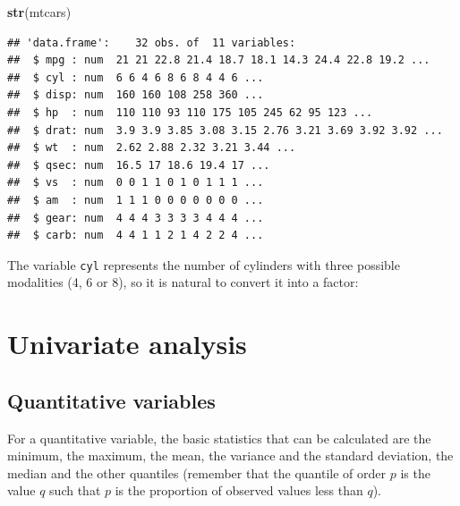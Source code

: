 \documentclass[]{book}
\newenvironment{Shaded}{\begin{snugshade}}{\end{snugshade}}
\newcommand{\KeywordTok}[1]{\textcolor[rgb]{0.13,0.29,0.53}{\textbf{#1}}}
\newcommand{\NormalTok}[1]{#1}
\newcommand{\OperatorTok}[1]{\textcolor[rgb]{0.81,0.36,0.00}{\textbf{#1}}}
\newcommand{\StringTok}[1]{\textcolor[rgb]{0.31,0.60,0.02}{#1}}
\begin{document}
\begin{Shaded}
\begin{Highlighting}[]
\KeywordTok{str}\NormalTok{(mtcars)}
\end{Highlighting}
\end{Shaded}

\begin{verbatim}
## 'data.frame':	32 obs. of  11 variables:
##  $ mpg : num  21 21 22.8 21.4 18.7 18.1 14.3 24.4 22.8 19.2 ...
##  $ cyl : num  6 6 4 6 8 6 8 4 4 6 ...
##  $ disp: num  160 160 108 258 360 ...
##  $ hp  : num  110 110 93 110 175 105 245 62 95 123 ...
##  $ drat: num  3.9 3.9 3.85 3.08 3.15 2.76 3.21 3.69 3.92 3.92 ...
##  $ wt  : num  2.62 2.88 2.32 3.21 3.44 ...
##  $ qsec: num  16.5 17 18.6 19.4 17 ...
##  $ vs  : num  0 0 1 1 0 1 0 1 1 1 ...
##  $ am  : num  1 1 1 0 0 0 0 0 0 0 ...
##  $ gear: num  4 4 4 3 3 3 3 4 4 4 ...
##  $ carb: num  4 4 1 1 2 1 4 2 2 4 ...
\end{verbatim}

The variable \texttt{cyl} represents the number of cylinders with three possible modalities (4, 6 or 8), so it is natural to convert it into a factor:

\begin{Shaded}
\end{Shaded}

\hypertarget{univariate-analysis}{%
\section{Univariate analysis}\label{univariate-analysis}}

\hypertarget{quant-var}{%
\subsection{Quantitative variables}\label{quant-var}}

For a quantitative variable, the basic statistics that can be calculated are the minimum, the maximum, the mean, the variance and the standard deviation, the median and the other quantiles (remember that the quantile of order \(p\) is the value \(q\) such that \(p\) is the proportion of observed values less than \(q\)).
\end{document}
